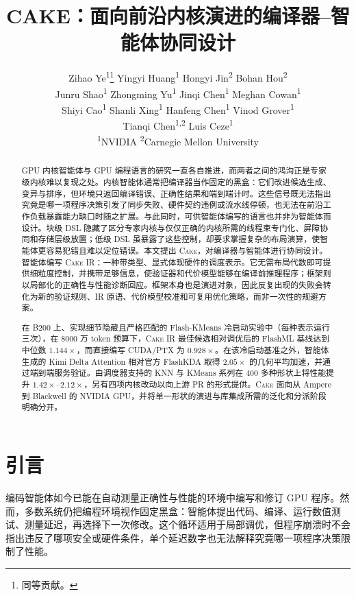 \documentclass[10pt]{article}
\title{\textbf{CAKE}：面向前沿内核演进的编译器--智能体协同设计}
\author{%
Zihao Ye\textsuperscript{1}\thanks{同等贡献。}\quad
Yingyi Huang\textsuperscript{1}\footnotemark[1]\quad
Hongyi Jin\textsuperscript{2}\quad
Bohan Hou\textsuperscript{2}\\
Junru Shao\textsuperscript{1}\quad
Zhongming Yu\textsuperscript{1}\quad
Jinqi Chen\textsuperscript{1}\quad
Meghan Cowan\textsuperscript{1}\\
Shiyi Cao\textsuperscript{1}\quad
Shanli Xing\textsuperscript{1}\quad
Hanfeng Chen\textsuperscript{1}\quad
Vinod Grover\textsuperscript{1}\\
Tianqi Chen\textsuperscript{1,2}\quad
Luis Ceze\textsuperscript{1}\\[0.6ex]
\small
\textsuperscript{1}NVIDIA\qquad
\textsuperscript{2}Carnegie Mellon University%
}
\date{}
\newcommand{\cake}{\textsc{Cake}}
\newcommand{\cakeir}{\textsc{Cake IR}}
\begin{document}
\maketitle

\begin{abstract}
GPU 内核智能体与 GPU 编程语言的研究一直各自推进，而两者之间的鸿沟正是专家级内核难以复现之处。内核智能体通常把编译器当作固定的黑盒：它们改进候选生成、变异与排序，但环境只返回编译错误、正确性结果和端到端计时。这些信号既无法指出究竟是哪一项程序决策引发了同步失败、硬件契约违例或流水线停顿，也无法在前沿工作负载暴露能力缺口时随之扩展。与此同时，可供智能体编写的语言也并非为智能体而设计。块级 DSL 隐藏了区分专家内核与仅仅正确的内核所需的线程束专门化、屏障协同和存储层级放置；低级 DSL 虽暴露了这些控制，却要求掌握复杂的布局演算，使智能体更容易犯错且难以定位错误。本文提出 \cake{}，对编译器与智能体进行协同设计。智能体编写 \cakeir{}：一种带类型、显式体现硬件的调度表示。它无需布局代数即可提供细粒度控制，并携带足够信息，使验证器和代价模型能够在编译前推理程序；框架则以局部化的正确性与性能诊断回应。框架本身也是演进对象，因此反复出现的失败会转化为新的验证规则、IR 原语、代价模型校准和可复用优化策略，而非一次性的规避方案。

在 B200 上、实现细节隐藏且严格匹配的 Flash-KMeans 冷启动实验中（每种表示运行三次），在 8000 万 token 预算下，\cakeir{} 最佳候选相对调优后的 FlashML 基线达到中位数 $1.144\times$，而直接编写 CUDA/PTX 为 $0.928\times$。在该冷启动基准之外，智能体生成的 Kimi Delta Attention 相对官方 FlashKDA 取得 $2.05\times$ 的几何平均加速，并通过端到端服务验证。由调度器支持的 KNN 与 KMeans 系列在 400 多种形状上将性能提升 $1.42\times$--$2.12\times$，另有四项内核改动以向上游 PR 的形式提供。\cake{} 面向从 Ampere 到 Blackwell 的 NVIDIA GPU，并将单一形状的演进与库集成所需的泛化和分派阶段明确分开。
\end{abstract}

\section{引言}
\label{sec:intro}

编码智能体如今已能在自动测量正确性与性能的环境中编写和修订 GPU 程序\cite{ouyang2024kernelbench,liao2025kernelevolve,dong2026kernelblaster,accelopt2025,autocomp2025,cheng2026kernelagent,dai2026cudaagent}。然而，多数系统仍把编程环境视作固定黑盒：智能体提出代码、编译、运行数值测试、测量延迟，再选择下一次修改。这个循环适用于局部调优，但程序崩溃时不会指出违反了哪项安全或硬件条件，单个延迟数字也无法解释究竟哪一项程序决策限制了性能。
\end{document}
